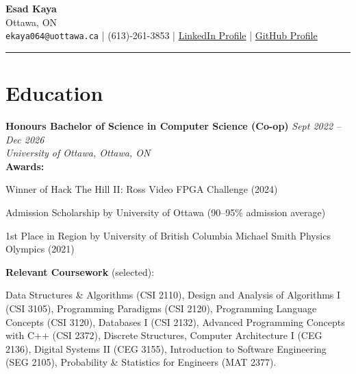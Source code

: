 \documentclass[11pt]{article}
\begin{document}
\begin{center}
    {\Huge \textbf{Esad Kaya}}\\
    \vspace{5pt}
    Ottawa, ON \\
    \texttt{ekaya064@uottawa.ca} \quad | \quad (613)-261-3853 \quad | \quad
    \href{https://www.linkedin.com/in/esad-kaya-28b400215/}{LinkedIn Profile} \quad | \quad
    \href{https://github.com/Integer-Conversion-Error}{GitHub Profile}
\end{center}


\hrule
\vspace{-0.4em}



\section*{Education}
\noindent\textbf{Honours Bachelor of Science in Computer Science (Co-op)} \hfill \textit{Sept 2022 -- Dec 2026} \\
\textit{University of Ottawa, Ottawa, ON} \\

\noindent\textbf{Awards:}
\begin{small}
\begin{compactitem}
    \item Winner of Hack The Hill II: Ross Video FPGA Challenge (2024)
    \item Admission Scholarship by University of Ottawa (90--95\% admission average)
    \item 1st Place in Region by University of British Columbia Michael Smith Physics Olympics (2021)

\end{compactitem}
\end{small}

\noindent\textbf{Relevant Coursework} (selected):
\begin{small}Data Structures \& Algorithms (CSI 2110), Design and Analysis of Algorithms I (CSI 3105), Programming Paradigms (CSI 2120), Programming Language Concepts (CSI 3120), Databases I (CSI 2132), Advanced Programming Concepts with C++ (CSI 2372), Discrete Structures, Computer Architecture I (CEG 2136), Digital Systems II (CEG 3155), Introduction to Software Engineering (SEG 2105), Probability \& Statistics for Engineers (MAT 2377).
\end{small}
\end{document}
